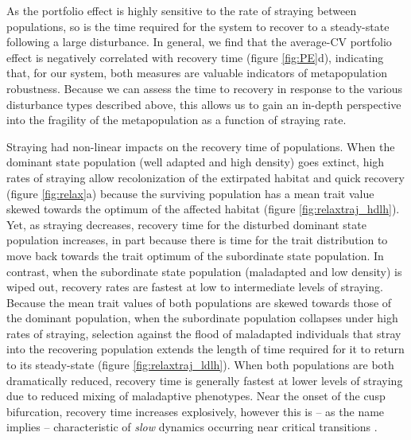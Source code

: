 \documentclass{revtex4}
\begin{document}
As the portfolio effect is highly sensitive to the rate of straying between populations, so is the time required for the system to recover to a steady-state following a large disturbance.
In general, we find that the average-CV portfolio effect is negatively correlated with recovery time (figure \ref{fig:PE}d), indicating that, for our system, both measures are valuable indicators of metapopulation robustness.
Because we can assess the time to recovery in response to the various disturbance types described above, this allows us to gain an in-depth perspective into the fragility of the metapopulation as a function of straying rate.


Straying had non-linear impacts on the recovery time of populations. 
When the dominant state population (well adapted and high density) goes extinct, high rates of straying allow recolonization of the extirpated habitat and quick recovery (figure \ref{fig:relax}a) because the surviving population has a mean trait value skewed towards the optimum of the affected habitat (figure \ref{fig:relaxtraj_hdlh}).
Yet, as straying decreases, recovery time for the disturbed dominant state population increases, in part because there is time for the trait distribution to move back towards the trait optimum of the subordinate state population.
In contrast, when the subordinate state population (maladapted and low density) is wiped out, recovery rates are fastest at low to intermediate levels of straying.
Because the mean trait values of both populations are skewed towards those of the dominant population, when the subordinate population collapses under high rates of straying, selection against the flood of maladapted individuals that stray into the recovering population extends the length of time required for it to return to its steady-state (figure \ref{fig:relaxtraj_ldlh}).
When both populations are both dramatically reduced, recovery time is generally fastest at lower levels of straying due to reduced mixing of maladaptive phenotypes.
Near the onset of the cusp bifurcation, recovery time increases explosively, however this is -- as the name implies -- characteristic of \emph{slow} dynamics occurring near critical transitions \citep{Scheffer:2009gg,Kuehn:2010p2591}.
\end{document}
